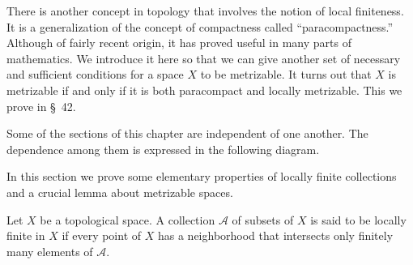 There is another concept in topology that involves the notion of local finiteness. It is a generalization of the concept of compactness called ``paracompactness.'' Although of fairly recent origin, it has proved useful in many parts of mathematics. We introduce it here so that we can give another set of necessary and sufficient conditions for a space \(X\) to be metrizable. It turns out that \(X\) is metrizable if and only if it is both paracompact and locally metrizable. This we prove in \S\ 42.

Some of the sections of this chapter are independent of one another. The dependence among them is expressed in the following diagram.

\par\nopagebreak
\begin{center}
	\label{fig:com_38_1}
\end{center}
\par\nopagebreak


In this section we prove some elementary properties of locally finite collections and a crucial lemma about metrizable spaces.

\begin{definition}
 Let \(X\) be a topological space. A collection \(\mathcal{A}\) of subsets of \(X\) is said to be locally finite in \(X\) if every point of \(X\) has a neighborhood that intersects only finitely many elements of \(\mathcal{A}\).
\end{definition}

